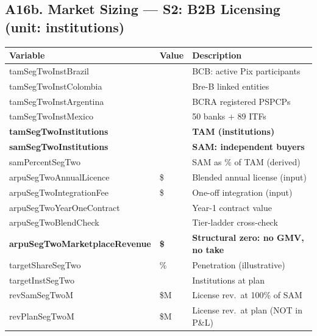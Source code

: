 \medskip
\subsection*{A16b. Market Sizing --- S2: B2B Licensing (unit: institutions)}
\begin{tabularx}{\linewidth}{l Y X}
\toprule
\textbf{Variable} & \textbf{Value} & \textbf{Description} \\\midrule
tamSegTwoInstBrazil & \numint{\tamSegTwoInstBrazil} & BCB: active Pix participants \\
tamSegTwoInstColombia & \numint{\tamSegTwoInstColombia} & Bre-B linked entities \\
tamSegTwoInstArgentina & \numint{\tamSegTwoInstArgentina} & BCRA registered PSPCPs \\
tamSegTwoInstMexico & \numint{\tamSegTwoInstMexico} & 50 banks + 89 ITFs \\
\textbf{tamSegTwoInstitutions} & \textbf{\validateint{\tamSegTwoInstitutions}{\HCtamSegTwoInstitutions}} & \textbf{TAM (institutions)} \\
\textbf{samSegTwoInstitutions} & \textbf{\validateint{\samSegTwoInstitutions}{\HCsamSegTwoInstitutions}} & \textbf{SAM: independent buyers} \\
samPercentSegTwo & \validatepct{\samPercentSegTwo}{\HCsamPercentSegTwo} & SAM as \% of TAM (derived) \\
arpuSegTwoAnnualLicence & \$\numint{\arpuSegTwoAnnualLicence} & Blended annual license (input) \\
arpuSegTwoIntegrationFee & \$\numint{\arpuSegTwoIntegrationFee} & One-off integration (input) \\
arpuSegTwoYearOneContract & \validatemoney{\arpuSegTwoYearOneContract}{\HCarpuSegTwoYearOneContract} & Year-1 contract value \\
arpuSegTwoBlendCheck & \validatemoney{\arpuSegTwoBlendCheck}{\HCarpuSegTwoBlendCheck} & Tier-ladder cross-check \\
\textbf{arpuSegTwoMarketplaceRevenue} & \textbf{\$\numint{\arpuSegTwoMarketplaceRevenue}} & \textbf{Structural zero: no GMV, no take} \\
targetShareSegTwo & \numint{\targetShareSegTwo}\% & Penetration (illustrative) \\
targetInstSegTwo & \validateint{\targetInstSegTwo}{\HCtargetInstSegTwo} & Institutions at plan \\
revSamSegTwoM & \$\validate{\revSamSegTwoM}{\HCrevSamSegTwoM}M & License rev.\ at 100\% of SAM \\
revPlanSegTwoM & \$\validate{\revPlanSegTwoM}{\HCrevPlanSegTwoM}M & License rev.\ at plan (NOT in P\&L) \\
\bottomrule
\end{tabularx}

